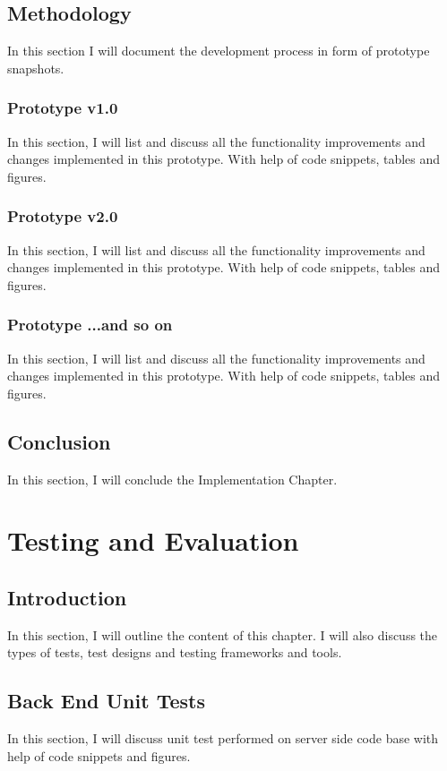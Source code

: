 \documentclass[12pt,twoside,a4paper]{report}
\begin{document}
\section{Methodology}
In this section I will document the development process in form of prototype snapshots.

\subsection{Prototype v1.0}
In this section, I will list and discuss all the functionality improvements and changes implemented in this prototype. With help of code snippets, tables and figures.

\subsection{Prototype v2.0}
In this section, I will list and discuss all the functionality improvements and changes implemented in this prototype. With help of code snippets, tables and figures.

\subsection{Prototype ...and so on}
In this section, I will list and discuss all the functionality improvements and changes implemented in this prototype. With help of code snippets, tables and figures.

\section{Conclusion}
In this section, I will conclude the Implementation Chapter.

\chapter{Testing and Evaluation}
\section{Introduction}
In this section, I will outline the content of this chapter. I will also discuss the types of tests, test designs and testing frameworks and tools.

\section{Back End Unit Tests}
In this section, I will discuss unit test performed on server side code base with help of code snippets and figures.
\end{document}
